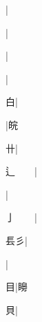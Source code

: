 \begin{multicols}{2}
{{}|{}\par
{\cjk{}{\cnsym{}　}{\cnsym{}　}{\cnsym{}　}}|{}\par
{\cjk{}{\cnsym{}　}{\cnsym{}　}{\cnsym{}　}}|{}\par
{}|{}\par
{\cjk{}{\cnsym{}　}{\cnsym{}　}白}|{}\par
{\cjk{}{\cnsym{}　}{\cnsym{}　}{\cnsym{}　}}|{\cjk{}皖}\par
{\cjk{}{\cnsym{}　}{\cnsym{}　}卄}|{}\par
{\cjk{}辶{\cnsym{}　}{\cnsym{}　}}|{}\par
{\cjk{}{\cnsym{}　}{\cnsym{}　}{\cnsym{}　}}|{}\par
{\cjk{}亅{\cnsym{}　}{\cnsym{}　}}|{}\par
{\cjk{}{\cnsym{}　}镸彡}|{}\par
{}|{}\par
{\cjk{}{\cnsym{}　}{\cnsym{}　}目}|{\cjk{}矈}\par
{\cjk{}{\cnsym{}　}{\cnsym{}　}貝}|{}\par
}
\end{multicols}
